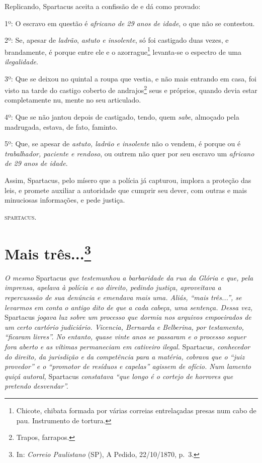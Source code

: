 {\asterisc{}

Replicando, Spartacus aceita a confissão de \asterisc{} e dá como provado:

1º: O escravo em questão é \emph{africano de 29 anos de idade}, o que
não se contestou.

2º: Se, apesar de \emph{ladrão}, \emph{astuto} \emph{e insolente}, só
foi castigado duas vezes, e brandamente, é porque entre ele e o
azorrague\footnote{ Chicote, chibata formada por várias correias
  entrelaçadas presas num cabo de pau. Instrumento de tortura.}
levanta-se o espectro de uma \emph{ilegalidade}.

3º: Que se deixou no quintal a roupa que vestia, e não mais entrando em
casa, foi visto na tarde do castigo coberto de andrajos\footnote{
  Trapos, farrapos.} seus e próprios, quando devia estar completamente
nu, mente \asterisc{} no seu articulado.

4º: Que se não jantou depois de castigado, tendo, quem \emph{sabe},
almoçado pela madrugada, estava, de fato, faminto.

5º: Que, se apesar de \emph{astuto, ladrão e insolente} não o vendem, é
porque ou é \emph{trabalhador, paciente e rendoso}, ou outrem não quer
por seu escravo um \emph{africano de 29 anos de idade}.

Assim, Spartacus, pelo mísero que a polícia já capturou, implora a
proteção das leis, e promete auxiliar a autoridade que cumprir seu
dever, com outras e mais minuciosas informações, e pede justiça.
\begin{flushright}
\textsc{spartacus}.
\end{flushright}

\chapter{Mais três...\footnote{ In: \emph{Correio Paulistano} (SP), A Pedido, 22/10/1870,
  p.~3.}} %

\begin{didascalia}
\emph{O mesmo} Spartacus \emph{que testemunhou a barbaridade da rua da
Glória e que, pela imprensa, apelava à polícia e ao direito, pedindo
justiça, aproveitava a repercusssão de sua denúncia e emendava mais uma.
Aliás, ``mais três...'', se levarmos em conta o antigo dito de que a cada
cabeça, uma sentença. Dessa vez,} Spartacus \emph{jogava luz sobre um
processo que dormia nos arquivos empoeirados de um certo cartório
judiciário. Vicencia, Bernarda e Belberina, por testamento, ``ficaram
livres''. No entanto, quase vinte anos se passaram e o processo sequer
fora aberto e as vítimas permaneciam em cativeiro ilegal.}
Spartacus\emph{, conhecedor do direito, da jurisdição e da competência
para a matéria, cobrava que o ``juiz provedor'' e o ``promotor de resíduos
e capelas'' agissem de ofício. Num lamento quiçá autoral,} Spartacus
\emph{constatava ``que longo é o cortejo de horrores que pretendo
desvendar''.}
\end{didascalia}

}
